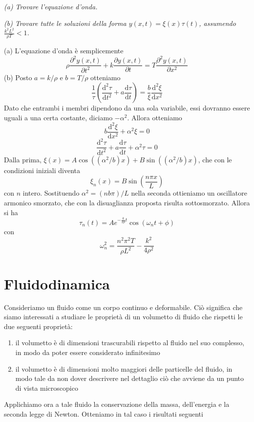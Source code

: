 \documentclass[a4paper,11pt]{article}
\begin{document}
\noindent\textit{(a) Trovare l'equazione d'onda.}

\noindent\textit{(b) Trovare tutte le soluzioni della forma $y(x,t)=\xi(x)\tau(t)$, assumendo $\frac{k^2L^2}{\rho T}<1$.}
\vspace{5mm}

\noindent (a) L'equazione d'onda è semplicemente
\[\rho\frac{\partial^2 y(x,t)}{\partial t^2}+k\frac{\partial y(x,t)}{\partial t}=T\frac{\partial^2y(x,t)}{\partial x^2}\]
\noindent (b) Posto $a=k/\rho$ e $b=T/\rho$ otteniamo
\[\frac{1}{\tau}\left(\frac{\mathrm{d}^2\tau}{\mathrm{d} t^2}+a\frac{\mathrm{d} \tau}{\mathrm{d} t}\right)=\frac{b}{\xi}\frac{\mathrm{d}^2\xi}{\mathrm{d} x^2}\]
Dato che entrambi i membri dipendono da una sola variabile, essi dovranno essere uguali a una certa costante, diciamo $-\alpha^2$. Allora otteniamo
\[b\frac{\mathrm{d}^2\xi}{\mathrm{d}x^2}+\alpha^2\xi=0\]
\[\frac{\mathrm{d}^2\tau}{\mathrm{d}t^2}+a\frac{\mathrm{d}\tau}{\mathrm{d}t}+\alpha^2\tau=0\]
Dalla prima, $\xi(x)=A\cos((\alpha^2/b)x)+B\sin((\alpha^2/b)x)$, che con le condizioni iniziali diventa
\[\xi_n(x)=B\sin(\frac{n\pi x}{L})\]
con $n$ intero. Sostituendo $\alpha^2=(nb\pi)/L$ nella seconda ottieniamo un oscillatore armonico smorzato, che con la disuaglianza proposta risulta sottosmorzato. Allora si ha 
\[\tau_n(t)=Ae^{-\frac{k}{2\rho}t}\cos(\omega_nt+\phi)\]
con 
\[\omega_n^2=\frac{n^2\pi^2T}{\rho L^2}-\frac{k^2}{4\rho^2}\]
\newpage

\section{Fluidodinamica}
Consideriamo un fluido come un corpo continuo e deformabile. Ciò significa che siamo interessati a studiare le proprietà di un volumetto di fluido che rispetti le due seguenti proprietà:

\begin{enumerate}
	\item il volumetto è di dimensioni trascurabili rispetto al fluido nel suo complesso, in modo da poter essere considerato infinitesimo
	\item il volumetto è di dimensioni molto maggiori delle particelle del fluido, in modo tale da non dover descrivere nel dettaglio ciò che avviene da un punto di vista microscopico
\end{enumerate}

\noindent Applichiamo ora a tale fluido la conservazione della massa, dell'energia e la seconda legge di Newton. Otteniamo in tal caso i risultati seguenti
\end{document}
